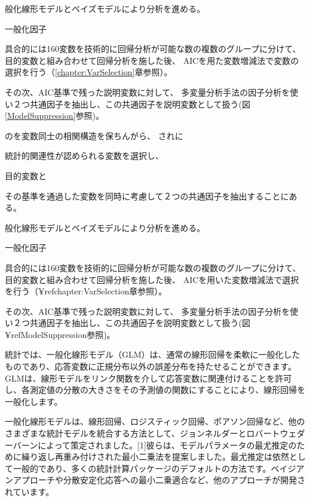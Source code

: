 \documentclass[a4j,11pt,mc]{jreport}
\begin{document}
般化線形モデルとベイズモデルにより分析を進める。

一般化因子


具合的には160変数を技術的に回帰分析が可能な数の複数のグループに分けて、
目的変数と組み合わせて回帰分析を施した後、
AICを用た変数増減法で変数の選択を行う（\ref{chapter:VarSelection}章参照）。


その次、AIC基準で残った説明変数に対して、
多変量分析手法の因子分析を使い２つ共通因子を抽出し、この共通因子を説明変数として扱う(図\ref{ModelSuppression}参照)。






のを変数同士の相関構造を保ちんがら、
されに

統計的関連性が認められる変数を選択し、


目的変数と





その基準を通過した変数を同時に考慮して２つの共通因子を抽出することにある。


般化線形モデルとベイズモデルにより分析を進める。

一般化因子


具合的には160変数を技術的に回帰分析が可能な数の複数のグループに分けて、
目的変数と組み合わせて回帰分析を施した後、
AICを用いた変数増減法で選択を行う（¥ref{chapter:VarSelection}章参照）。


その次、AIC基準で残った説明変数に対して、
多変量分析手法の因子分析を使い２つ共通因子を抽出し、この共通因子を説明変数として扱う(図¥ref{ModelSuppression}参照)。







統計では、一般化線形モデル（GLM）は、通常の線形回帰を柔軟に一般化したものであり、応答変数に正規分布以外の誤差分布を持たせることができます。 GLMは、線形モデルをリンク関数を介して応答変数に関連付けることを許可し、各測定値の分散の大きさをその予測値の関数にすることにより、線形回帰を一般化します。

一般化線形モデルは、線形回帰、ロジスティック回帰、ポアソン回帰など、他のさまざまな統計モデルを統合する方法として、ジョンネルダーとロバートウェダーバーンによって策定されました。[1]彼らは、モデルパラメータの最尤推定のために繰り返し再重み付けされた最小二乗法を提案しました。最尤推定は依然として一般的であり、多くの統計計算パッケージのデフォルトの方法です。ベイジアンアプローチや分散安定化応答への最小二乗適合など、他のアプローチが開発されています。
\end{document}
